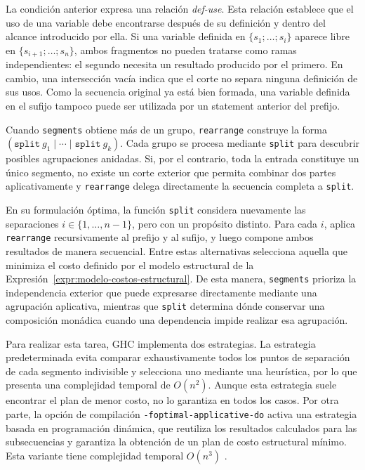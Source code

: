 La condición anterior expresa una relación \textit{def-use}. Esta relación establece que el uso de una variable debe encontrarse después de su definición y dentro del alcance introducido por ella. Si una variable definida en $\{s_1;\ldots;s_i\}$ aparece libre en $\{s_{i+1};\ldots;s_n\}$, ambos fragmentos no pueden tratarse como ramas independientes: el segundo necesita un resultado producido por el primero. En cambio, una intersección vacía indica que el corte no separa ninguna definición de sus usos. Como la secuencia original ya está bien formada, una variable definida en el sufijo tampoco puede ser utilizada por un statement anterior del prefijo.

Cuando \texttt{segments} obtiene más de un grupo, \texttt{rearrange} construye la forma $(\texttt{split}\ g_1\mid\cdots\mid\texttt{split}\ g_k)$. Cada grupo se procesa mediante \texttt{split} para descubrir posibles agrupaciones anidadas. Si, por el contrario, toda la entrada constituye un único segmento, no existe un corte exterior que permita combinar dos partes aplicativamente y \texttt{rearrange} delega directamente la secuencia completa a \texttt{split}.

En su formulación óptima, la función \texttt{split} considera nuevamente las separaciones $i\in\{1,\ldots,n-1\}$, pero con un propósito distinto. Para cada $i$, aplica \texttt{rearrange} recursivamente al prefijo y al sufijo, y luego compone ambos resultados de manera secuencial. Entre estas alternativas selecciona aquella que minimiza el costo definido por el modelo estructural de la Expresión~\ref{expr:modelo-costos-estructural}. De esta manera, \texttt{segments} prioriza la independencia exterior que puede expresarse directamente mediante una agrupación aplicativa, mientras que \texttt{split} determina dónde conservar una composición monádica cuando una dependencia impide realizar esa agrupación.

Para realizar esta tarea, \textsf{GHC} implementa dos estrategias. La estrategia predeterminada evita comparar exhaustivamente todos los puntos de separación de cada segmento indivisible y selecciona uno mediante una heurística, por lo que presenta una complejidad temporal de $O(n^2)$. Aunque esta estrategia suele encontrar el plan de menor costo, no lo garantiza en todos los casos. Por otra parte, la opción de compilación \texttt{-foptimal-applicative-do} activa una estrategia basada en programación dinámica, que reutiliza los resultados calculados para las subsecuencias y garantiza la obtención de un plan de costo estructural mínimo. Esta variante tiene complejidad temporal $O(n^3)$ \cite{GHCApplicativeDo}.

